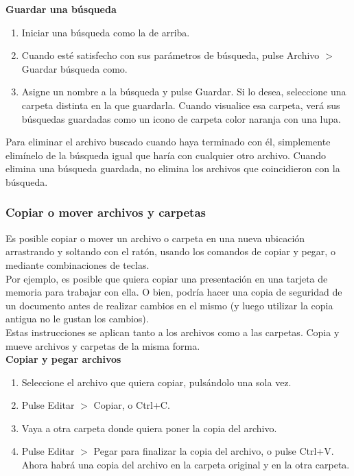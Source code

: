 {\large \bf Guardar una búsqueda}
\begin{enumerate}
\item Iniciar una búsqueda como la de arriba.
\item Cuando esté satisfecho con sus parámetros de búsqueda, pulse Archivo $>$ Guardar búsqueda como.
\item Asigne un nombre a la búsqueda y pulse Guardar. Si lo desea, seleccione una carpeta distinta en la que guardarla. Cuando visualice esa carpeta, verá sus búsquedas guardadas como un icono de carpeta color naranja con una lupa.
\end{enumerate}
Para eliminar el archivo buscado cuando haya terminado con él, simplemente elimínelo de la búsqueda igual que haría con cualquier otro archivo. Cuando elimina una búsqueda guardada, no elimina los archivos que coincidieron con la búsqueda.
\subsubsection{Copiar o mover archivos y carpetas}
Es posible copiar o mover un archivo o carpeta en una nueva ubicación arrastrando y soltando con el ratón, usando los comandos de copiar y pegar, o mediante combinaciones de teclas.\\

Por ejemplo, es posible que quiera copiar una presentación en una tarjeta de memoria para trabajar con ella. O bien, podría hacer una copia de seguridad de un documento antes de realizar cambios en el mismo (y luego utilizar la copia antigua no le gustan los cambios).\\
Estas instrucciones se aplican tanto a los archivos como a las carpetas. Copia y mueve archivos y carpetas de la misma forma.\\

{\bf Copiar y pegar archivos}\\
\begin{enumerate}
\item Seleccione el archivo que quiera copiar, pulsándolo una sola vez.
\item Pulse Editar $>$ Copiar, o Ctrl+C.
\item Vaya a otra carpeta donde quiera poner la copia del archivo.
\item Pulse Editar $>$ Pegar para finalizar la copia del archivo, o pulse Ctrl+V. Ahora habrá una copia del archivo en la carpeta original y en la otra carpeta.
\end{enumerate}

